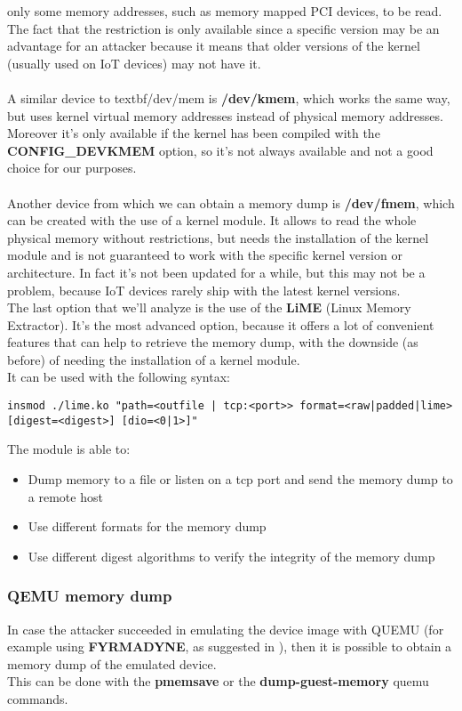 only some memory addresses, such as memory mapped PCI devices, to be read.
The fact that the restriction is only available since a specific version may be an advantage for an attacker
because it means that older versions of the kernel (usually used on IoT devices) may not have it.\\\\
A similar device to textbf{/dev/mem} is \textbf{/dev/kmem}, which works the same 
way, but uses kernel virtual memory addresses instead of physical memory addresses.\\
Moreover it's only available if the kernel has been compiled with the \textbf{CONFIG\_DEVKMEM} option, so 
it's not always available and not a good choice for our purposes.\\\\
Another device from which we can obtain a memory dump is \textbf{/dev/fmem}\cite{dev-fmem}, which
can be created with the use of a kernel module. It allows to read the whole physical memory
without restrictions, but needs the installation of the kernel module and is not guaranteed to 
work with the specific kernel version or architecture. In fact it's not been updated
for a while, but this may not be a problem, because IoT devices rarely ship with the latest
kernel versions.\\
The last option that we'll analyze is the use of the \textbf{LiME} (Linux Memory Extractor)\cite{lime}.
It's the most advanced option, because it offers a lot of convenient
features that can help to retrieve the memory dump, with the downside (as before)
of needing the installation of a kernel module.\\
It can be used with the following syntax:
\begin{lstlisting}[numbers=none]
    insmod ./lime.ko "path=<outfile | tcp:<port>> format=<raw|padded|lime> [digest=<digest>] [dio=<0|1>]"
\end{lstlisting}
The module is able to:
\begin{itemize}
    \item Dump memory to a file or listen on a tcp port and send the memory dump to a remote host
    \item Use different formats for the memory dump
    \item Use different digest algorithms to verify the integrity of the memory dump 
\end{itemize}

\subsubsection{QEMU memory dump}
In case the attacker succeeded in emulating the device image with QUEMU (for example
using \textbf{FYRMADYNE}\cite{firmadyne}, as suggested in \cite{previouswork}), then it is possible
to obtain a memory dump of the emulated device.\\
This can be done with the \textbf{pmemsave} or the \textbf{dump-guest-memory} quemu commands.\\

